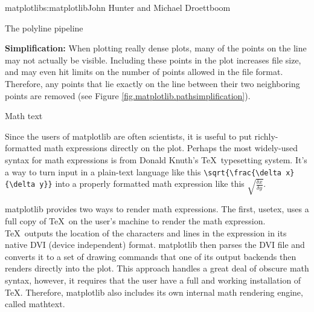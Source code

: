 \begin{aosachapter}{matplotlib}{s:matplotlib}{John Hunter and Michael Droettboom}
\begin{aosasect1}{The polyline pipeline}
\begin{aosaenumerate}
\item \textbf{Simplification:} When plotting really dense plots, many
  of the points on the line may not actually be visible.  Including
  these points in the plot increases file size, and may even hit
  limits on the number of points allowed in the file format.
  Therefore, any points that lie exactly on the line between their two
  neighboring points are removed (see Figure
  \ref{fig.matplotlib.pathsimplification}).

\end{aosaenumerate}



\end{aosasect1}

\begin{aosasect1}{Math text}

Since the users of matplotlib are often scientists, it is useful to
put richly-formatted math expressions directly on the plot.  Perhaps
the most widely-used syntax for math expressions is from Donald
Knuth's \TeX\ typesetting system.  It's a way to turn input in a
plain-text language like this \verb+\sqrt{\frac{\delta x}{\delta y}}+
into a properly formatted math expression like this
$\sqrt{\frac{\delta x}{\delta y}}$.

matplotlib provides two ways to render math expressions.  The first,
usetex, uses a full copy of \TeX\ on the user's machine to render the
math expression.  \TeX\ outputs the location of the characters and
lines in the expression in its native DVI (device independent) format.
matplotlib then parses the DVI file and converts it to a set of
drawing commands that one of its output backends then renders directly
into the plot.  This approach handles a great deal of obscure math
syntax, however, it requires that the user have a full and working
installation of \TeX.  Therefore, matplotlib also includes its own
internal math rendering engine, called mathtext.


\end{aosasect1}
\end{aosachapter}
